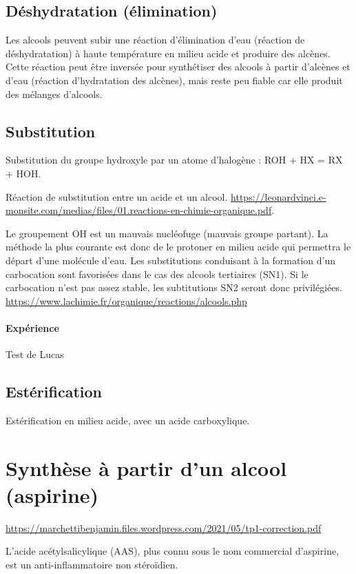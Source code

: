 \documentclass[11pt]{report}
\numberwithin{figure}{section}
\numberwithin{equation}{section}
\numberwithin{table}{section}
\newcommand{\1}{\boldsymbol{1}}
\begin{document}
\subsection{Déshydratation (élimination)}


Les alcools peuvent subir une réaction d'élimination d'eau (réaction de déshydratation) à haute température en milieu acide et produire des alcènes. Cette réaction peut être inversée pour synthétiser des alcools à partir d'alcènes et d'eau (réaction d'hydratation des alcènes), mais reste peu fiable car elle produit des mélanges d'alcools.

\subsection{Substitution}

Substitution du groupe hydroxyle par un atome d’halogène : ROH + HX = RX + HOH.

Réaction de substitution entre un acide et un alcool. \url{https://leonardvinci.e-monsite.com/medias/files/01.reactions-en-chimie-organique.pdf}.


Le groupement OH est un mauvais nucléofuge (mauvais groupe partant). La méthode la plus courante est donc de le protoner en milieu acide qui permettra le départ d'une molécule d'eau. Les substitutions conduisant à la formation d'un carbocation sont favorisées dans le cas des alcools tertiaires (SN1). Si le carbocation n'est pas assez stable, les subtitutions SN2 seront donc privilégiées. \url{https://www.lachimie.fr/organique/reactions/alcools.php}

\paragraph{Expérience} Test de Lucas

\subsection{Estérification}

Estérification en milieu acide, avec un acide carboxylique.

\section{Synthèse à partir d’un alcool (aspirine)}

\url{https://marchettibenjamin.files.wordpress.com/2021/05/tp1-correction.pdf}

L’acide acétylsalicylique (AAS), plus connu sous le nom commercial d’aspirine, est un anti-inflammatoire non stéroïdien.
\end{document}
